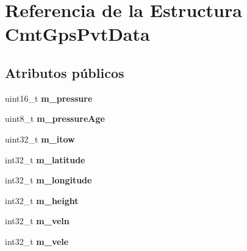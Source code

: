 \hypertarget{structCmtGpsPvtData}{\section{\-Referencia de la \-Estructura \-Cmt\-Gps\-Pvt\-Data}
\label{structCmtGpsPvtData}
}
\subsection*{\-Atributos públicos}
\begin{DoxyCompactItemize}
\item 
\hypertarget{structCmtGpsPvtData_a3d69d61414e03e11baa7fef4c8504444}{uint16\-\_\-t {\bfseries m\-\_\-pressure}}\label{structCmtGpsPvtData_a3d69d61414e03e11baa7fef4c8504444}

\item 
\hypertarget{structCmtGpsPvtData_a7e4a0b16130c1dd50811dd5a154c0239}{uint8\-\_\-t {\bfseries m\-\_\-pressure\-Age}}\label{structCmtGpsPvtData_a7e4a0b16130c1dd50811dd5a154c0239}

\item 
\hypertarget{structCmtGpsPvtData_aa8db37951340ddb134457613933f5dd7}{uint32\-\_\-t {\bfseries m\-\_\-itow}}\label{structCmtGpsPvtData_aa8db37951340ddb134457613933f5dd7}

\item 
\hypertarget{structCmtGpsPvtData_a161b04bd1857e6e0d00ae5a9125f9b72}{int32\-\_\-t {\bfseries m\-\_\-latitude}}\label{structCmtGpsPvtData_a161b04bd1857e6e0d00ae5a9125f9b72}

\item 
\hypertarget{structCmtGpsPvtData_af167a2fe3103d6e06d033f8bd998e1b3}{int32\-\_\-t {\bfseries m\-\_\-longitude}}\label{structCmtGpsPvtData_af167a2fe3103d6e06d033f8bd998e1b3}

\item 
\hypertarget{structCmtGpsPvtData_a5dd37166e30556c45e2e205473040dee}{int32\-\_\-t {\bfseries m\-\_\-height}}\label{structCmtGpsPvtData_a5dd37166e30556c45e2e205473040dee}

\item 
\hypertarget{structCmtGpsPvtData_ae49d0f6d0bcdc2e640114bc8a7edf258}{int32\-\_\-t {\bfseries m\-\_\-veln}}\label{structCmtGpsPvtData_ae49d0f6d0bcdc2e640114bc8a7edf258}

\item 
\hypertarget{structCmtGpsPvtData_a48974c48491ac209e0e89c02774f91e1}{int32\-\_\-t {\bfseries m\-\_\-vele}}\label{structCmtGpsPvtData_a48974c48491ac209e0e89c02774f91e1}


\end{DoxyCompactItemize}
